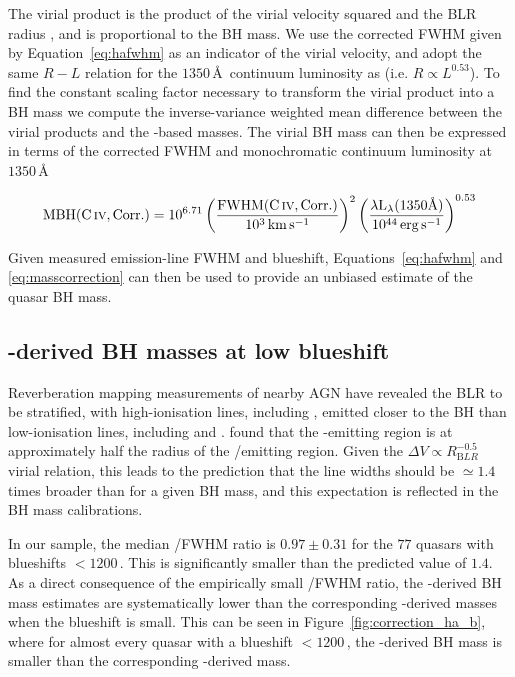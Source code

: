 The virial product is the product of the virial velocity squared and the BLR radius \citep[e.g.][]{shen13}, and is proportional to the BH mass. 
We use the corrected  FWHM given by Equation~\ref{eq:hafwhm} as an indicator of the virial velocity, and adopt the same $R-L$ relation for the $1350$\,\AA\, continuum luminosity as \citet{vestergaard06} (i.e. $R \propto L^{0.53}$). 
To find the constant scaling factor necessary to transform the virial product into a BH mass we compute the inverse-variance weighted mean difference between the virial products and the \hans-based masses. 
The virial BH mass can then be expressed in terms of the corrected  FWHM and monochromatic continuum luminosity at $1350$\,\AA

\begin{eqnarray}
  \label{eq:masscorrection}
  \mathrm{MBH}(\mathrm{C}\,\textsc{iv}, \mathrm{Corr.}) = 10^{6.71}\left( \frac{ \mathrm{FWHM}(\mathrm{C}\,\textsc{iv}, \mathrm{Corr.})}{10^3 \mathrm{\,km\,s^{-1}}} \right)^2 \left( \frac{\lambda \mathrm{L}_{\lambda} (1350 \text{\AA}) }{10^{44} \mathrm{\,erg\,s^{-1}}}  \right)^{0.53}
\end{eqnarray}

Given measured  emission-line FWHM and blueshift, Equations~\ref{eq:hafwhm} and \ref{eq:masscorrection} can then be used to provide an unbiased estimate of the quasar BH mass.

\subsection{-derived BH masses at low  blueshift}

Reverberation mapping measurements of nearby AGN have revealed the BLR to be stratified, with high-ionisation lines, including , emitted closer to the BH than low-ionisation lines, including \ha and \hb \citep[e.g.][]{onken02}.
\citet{vestergaard06} found that the -emitting region is at approximately half the radius of the \hbns/\ha emitting region.
Given the $\Delta V \propto R_{\mathrm BLR}^{-0.5}$ virial relation, this leads to the prediction that the  line widths should be $\simeq 1.4$ times broader than \ha for a given BH mass, and this expectation is reflected in the \citet{vestergaard06} BH mass calibrations.

In our sample, the median /\ha FWHM ratio is $0.97 \pm 0.31$ for the $77$ quasars with  blueshifts $<1200$\,\kms.
This is significantly smaller than the predicted value of $1.4$. 
As a direct consequence of the empirically small /\ha FWHM ratio, the -derived BH mass estimates are systematically lower than the corresponding \hans-derived masses when the blueshift is small.
This can be seen in Figure~\ref{fig:correction_ha_b}, where for almost every quasar with a  blueshift $<$$1200$\,\kms, the -derived BH mass is smaller than the corresponding \hans-derived mass.

